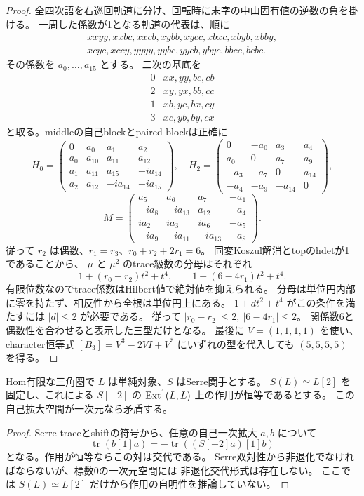 \begin{proof}
全四次語を右巡回軌道に分け、回転時に末字の中山固有値の逆数の負を掛ける。
一周した係数が1となる軌道の代表は、順に
\[
\begin{gathered}
xxyy,xxbc,xxcb,xybb,xycc,xbxc,xbyb,xbby,\\
xcyc,xccy,yyyy,yybc,yycb,ybyc,bbcc,bcbc.
\end{gathered}
\]
その係数を $a_0,\ldots,a_{15}$ とする。
二次の基底を
\[
\begin{array}{c|l}
0&xx,yy,bc,cb\\2&xy,yx,bb,cc\\1&xb,yc,bx,cy\\3&xc,yb,by,cx
\end{array}
\]
と取る。middleの自己blockとpaired blockは正確に
\[
 H_0=\begin{pmatrix}
0&a_0&a_1&a_2\\a_0&a_{10}&a_{11}&a_{12}\\
a_1&a_{11}&a_{15}&-ia_{14}\\a_2&a_{12}&-ia_{14}&-ia_{15}
\end{pmatrix},\quad
 H_2=\begin{pmatrix}
0&-a_0&a_3&a_4\\a_0&0&a_7&a_9\\
-a_3&-a_7&0&a_{14}\\-a_4&-a_9&-a_{14}&0
\end{pmatrix},
\]
\[
 M=\begin{pmatrix}
a_5&a_6&a_7&-a_1\\-ia_8&-ia_{13}&a_{12}&-a_4\\
ia_2&ia_3&ia_6&-a_5\\-ia_9&-ia_{11}&-ia_{13}&-a_8
\end{pmatrix}.
\]
従って $r_2$ は偶数、$r_1=r_3$、$r_0+r_2+2r_1=6$。
同変Koszul解消とtopのhdetが1であることから、
$\mu$ と $\mu^2$ のtrace級数の分母はそれぞれ
\[
 1+(r_0-r_2)t^2+t^4,\qquad 1+(6-4r_1)t^2+t^4.
\]
有限位数なのでtrace係数はHilbert値で絶対値を抑えられる。
分母は単位円内部に零を持たず、相反性から全根は単位円上にある。
$1+dt^2+t^4$ がこの条件を満たすには $|d|\le2$ が必要である。
従って $|r_0-r_2|\le2,\ |6-4r_1|\le2$。
関係数6と偶数性を合わせると表示した三型だけとなる。
最後に $V=(1,1,1,1)$ を使い、character恒等式
$[B_3]=V^3-2VI+V^*$ にいずれの型を代入しても $(5,5,5,5)$ を得る。
\end{proof}

\begin{lemma}
\label{lem:cubic-twisted-character-Serre}
Hom有限な三角圏で $L$ は単純対象、$S$ はSerre関手とする。
$S(L)\simeq L[2]$ を固定し、これによる $S[-2]$ の
$\operatorname{Ext}^1(L,L)$ 上の作用が恒等であるとする。
この自己拡大空間が一次元なら矛盾する。
\end{lemma}
\begin{proof}
Serre traceとshiftの符号から、任意の自己一次拡大 $a,b$ について
\[
 \operatorname{tr}(b[1]a)=-\operatorname{tr}((S[-2]a)[1]b)
\]
となる。作用が恒等ならこの対は交代である。
Serre双対性から非退化でなければならないが、標数0の一次元空間には
非退化交代形式は存在しない。
ここでは $S(L)\simeq L[2]$ だけから作用の自明性を推論していない。
\end{proof}

